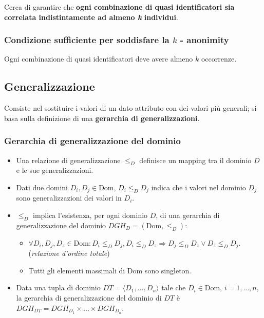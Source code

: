 \documentclass{report}
\begin{document}
Cerca di garantire che \textbf{ogni 
combinazione di quasi identificatori sia correlata indistintamente ad almeno \textit{k} individui}.

\subsubsection{Condizione sufficiente per soddisfare la $k$ - anonimity}
Ogni combinazione di quasi identificatori deve avere almeno $k$ occorrenze.

\subsection{Generalizzazione}
Consiste nel sostituire i valori di un dato attributo con dei valori più generali;
si basa sulla definizione di una \textbf{gerarchia di generalizzazioni}.

\subsubsection{Gerarchia di generalizzazione del dominio}
\begin{itemize}
    \item Una relazione di generalizzazione $\leq_D$ definisce un mapping tra il dominio $D$ e le sue generalizzazioni.
    \item Dati due domini $D_i, D_j \in \text{Dom}$, $D_i \leq_D D_j$ indica che i valori nel dominio $D_j$ sono generalizzazioni dei valori in $D_i$.
    \item $\leq_D$ implica l'esistenza, per ogni dominio $D$, di una gerarchia di generalizzazione del dominio $DGH_D = (\text{Dom}, \leq_D)$:
    \begin{itemize}
        \item $\forall D_i, D_j, D_z \in \text{Dom}: D_i \leq_D D_j, D_i \leq_D D_z \Rightarrow D_j \leq_D D_z \lor D_z \leq_D D_j$. (\textit{relazione d'ordine totale})
        \item Tutti gli elementi massimali di $\text{Dom}$ sono singleton.
    \end{itemize}
    \item Data una tupla di dominio $DT = \langle D_1, \ldots, D_n \rangle$ tale che $D_i \in \text{Dom}$, $i = 1, \ldots, n$, la gerarchia di generalizzazione del dominio di $DT$ è $DGH_{DT} = DGH_{D_1} \times \ldots \times DGH_{D_n}$. 
\end{itemize}  

\newpage
\end{document}
